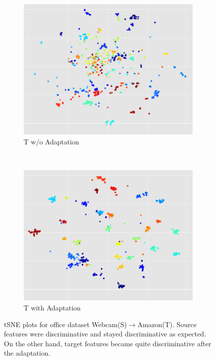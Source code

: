 \begin{figure}[ht]
\begin{subfigure}[b]{0.25\textwidth}
        \includegraphics[width=\textwidth]{before_c_t_c}
        \caption{T w/o Adaptation}
        \label{fig:gull}
    \end{subfigure}~\begin{subfigure}[b]{0.25\textwidth}
        \includegraphics[width=\textwidth]{after_c_t_c}
        \caption{T with Adaptation}
    \end{subfigure}
    \vspace{-5mm}
    \caption{tSNE plots for office dataset Webcam(S)$\rightarrow$Amazon(T). Source features were discriminative and stayed discriminative as expected. On the other hand, target features became quite discriminative after the adaptation.}

\end{figure}
